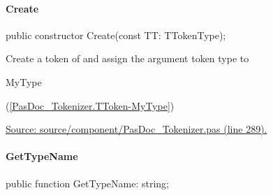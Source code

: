 \documentclass{report}
\newif\ifpdf
\begin{document}
\paragraph*{Create}\hspace*{\fill}

\label{PasDoc_Tokenizer.TToken-Create}
\begin{list}{}{
\setlength{\itemindent}{0cm}
\setlength{\listparindent}{0cm}
\setlength{\leftmargin}{\evensidemargin}
\addtolength{\leftmargin}{\tmplength}
\settowidth{\labelsep}{X}
\addtolength{\leftmargin}{\labelsep}
\setlength{\labelwidth}{\tmplength}
}
\item[\textbf{Declaration}\hfill]
\ifpdf
\begin{flushleft}
\fi
\begin{ttfamily}
public constructor Create(const TT: TTokenType);\end{ttfamily}

\ifpdf
\end{flushleft}
\fi

\par
\item[\textbf{Description}]
Create a token of and assign the argument token type to \begin{ttfamily}MyType\end{ttfamily}(\ref{PasDoc_Tokenizer.TToken-MyType})\par
\href{https://github.com/pasdoc/pasdoc/blob/master/source/component/PasDoc_Tokenizer.pas#L289}{Source: source/component/PasDoc{\_}Tokenizer.pas (line 289).}

\end{list}
\paragraph*{GetTypeName}\hspace*{\fill}

\label{PasDoc_Tokenizer.TToken-GetTypeName}
\begin{list}{}{
\setlength{\itemindent}{0cm}
\setlength{\listparindent}{0cm}
\setlength{\leftmargin}{\evensidemargin}
\addtolength{\leftmargin}{\tmplength}
\settowidth{\labelsep}{X}
\addtolength{\leftmargin}{\labelsep}
\setlength{\labelwidth}{\tmplength}
}
\item[\textbf{Declaration}\hfill]
\ifpdf
\begin{flushleft}
\fi
\begin{ttfamily}
public function GetTypeName: string;\end{ttfamily}

\ifpdf
\end{flushleft}
\fi

\end{list}
\end{document}
